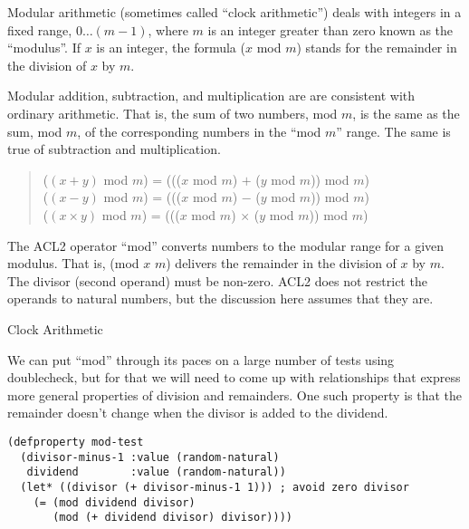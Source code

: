 \begin{aside}
Modular arithmetic (sometimes called ``clock arithmetic'')
deals with integers in a fixed range, $0 \dots (m - 1)$,
where $m$ is an integer greater than zero known as
the ``modulus''.
If $x$ is an integer, the formula ($x$ mod $m$) stands for
the remainder in the division of $x$ by $m$.

Modular addition, subtraction, and multiplication are
are consistent with ordinary arithmetic.
That is, the sum of two numbers, mod $m$,
is the same as the sum, mod $m$, of the corresponding numbers
in the ``mod $m$'' range.
The same is true of subtraction and multiplication.

\begin{quote}
($(x + y)$ mod $m$) = ((($x$ mod $m$) $+$ ($y$ mod $m$)) mod $m$) \\
($(x - y)$ mod $m$) = ((($x$ mod $m$) $-$ ($y$ mod $m$)) mod $m$) \\
($(x \times y)$ mod $m$) = ((($x$ mod $m$) $\times$ ($y$ mod $m$)) mod $m$)
\end{quote}

The ACL2 operator ``mod'' converts numbers to the modular range
for a given modulus. That is, (mod $x$ $m$) delivers the remainder
in the division of $x$ by $m$.
The divisor (second operand) must be non-zero.
ACL2 does not restrict the operands to natural numbers,
but the discussion here assumes that they are.
\caption{Clock Arithmetic}
\label{modular-arithmetic}
\end{aside}

We can put ``mod''
through its paces on a large number of tests using doublecheck,
but for that we will need to come up with relationships
that express more general properties of division and remainders.
One such property is that the remainder doesn't change
when the divisor is added to the dividend.

\begin{Verbatim}
(defproperty mod-test
  (divisor-minus-1 :value (random-natural)
   dividend        :value (random-natural))
  (let* ((divisor (+ divisor-minus-1 1))) ; avoid zero divisor
    (= (mod dividend divisor)
       (mod (+ dividend divisor) divisor))))
\end{Verbatim}

